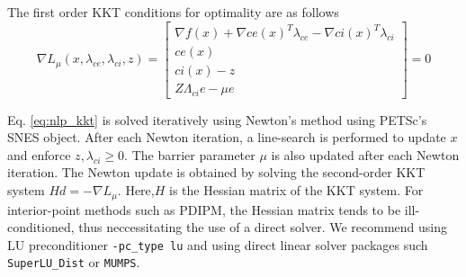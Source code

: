 The first order KKT conditions for optimality are as follows
\begin{equation}
\nabla L_{\mu}(x,\lambda_{ce},\lambda_{ci},z)    =
    \begin{bmatrix}
        \nabla f(x) + \nabla ce(x)^T\lambda_{ce} -  \nabla ci(x)^T \lambda_{ci} \\
        ce(x) \\
        ci(x) - z \\
        Z\Lambda_{ci}e - \mu e
    \end{bmatrix}
= 0
\label{eq:nlp_kkt}
\end{equation}

Eq. \ref{eq:nlp_kkt} is solved iteratively using Newton's method using PETSc's SNES object. After each Newton iteration, 
a line-search is performed to update $x$ and enforce $z,\lambda_{ci} \geq 0$. The barrier parameter $\mu$ is also updated
after each Newton iteration. The Newton update is obtained by solving the second-order KKT system $Hd = -\nabla L_{\mu}$. Here,$H$
is the Hessian matrix of the KKT system. For interior-point methods such as PDIPM, the Hessian matrix tends to be ill-conditioned,
thus neccessitating the use of a direct solver. We recommend using LU preconditioner {\tt -pc\_type lu} and using direct linear
solver packages such {\tt SuperLU\_Dist} or {\tt MUMPS}.


